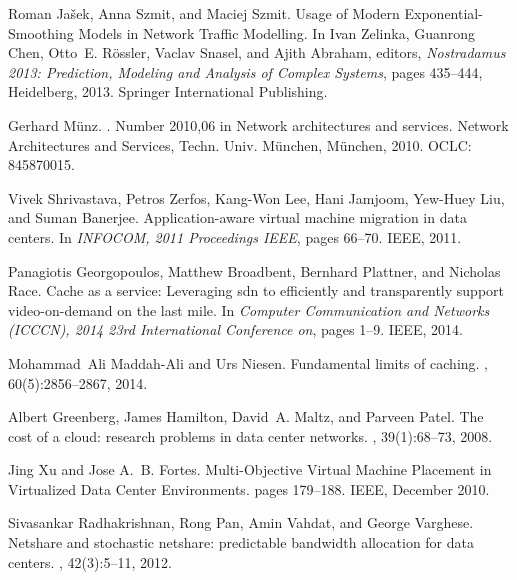 \begin{thebibliography}{100}
 Roman Ja{\v s}ek, Anna Szmit, and Maciej Szmit.
\newblock Usage of {Modern} {Exponential}-{Smoothing} {Models} in {Network}
  {Traffic} {Modelling}.
\newblock In Ivan Zelinka, Guanrong Chen, Otto~E. R{\"o}ssler, Vaclav Snasel,
  and Ajith Abraham, editors, {\em Nostradamus 2013: {Prediction}, {Modeling}
  and {Analysis} of {Complex} {Systems}}, pages 435--444, Heidelberg, 2013.
  Springer International Publishing.

 Gerhard M{\"u}nz.
.
\newblock Number 2010,06 in Network architectures and services. Network
  Architectures and Services, Techn. Univ. M{\"u}nchen, M{\"u}nchen, 2010.
\newblock OCLC: 845870015.

 Vivek Shrivastava, Petros Zerfos, Kang-Won Lee, Hani Jamjoom, Yew-Huey Liu, and
  Suman Banerjee.
\newblock Application-aware virtual machine migration in data centers.
\newblock In {\em {INFOCOM}, 2011 {Proceedings} {IEEE}}, pages 66--70. IEEE,
  2011.

 Panagiotis Georgopoulos, Matthew Broadbent, Bernhard Plattner, and Nicholas
  Race.
\newblock Cache as a service: {Leveraging} sdn to efficiently and transparently
  support video-on-demand on the last mile.
\newblock In {\em Computer {Communication} and {Networks} ({ICCCN}), 2014 23rd
  {International} {Conference} on}, pages 1--9. IEEE, 2014.

 Mohammad~Ali Maddah-Ali and Urs Niesen.
\newblock Fundamental limits of caching.
, 60(5):2856--2867,
  2014.

 Albert Greenberg, James Hamilton, David~A. Maltz, and Parveen Patel.
\newblock The cost of a cloud: research problems in data center networks.
, 39(1):68--73, 2008.

 Jing Xu and Jose A.~B. Fortes.
\newblock Multi-{Objective} {Virtual} {Machine} {Placement} in {Virtualized}
  {Data} {Center} {Environments}.
\newblock pages 179--188. IEEE, December 2010.

 Sivasankar Radhakrishnan, Rong Pan, Amin Vahdat, and George Varghese.
\newblock Netshare and stochastic netshare: predictable bandwidth allocation
  for data centers.
, 42(3):5--11, 2012.


\end{thebibliography}
